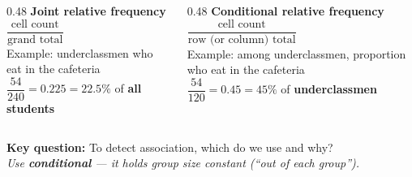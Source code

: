 \documentclass[aspectratio=169, 11pt]{beamer}
\begin{document}
{
\begin{frame}[t, plain]
  \vspace{1.05cm}\par
  \hspace{0.4cm}%
  \begin{minipage}{0.93\textwidth}
    \vspace{1em}
    \small
    \begin{columns}[T]
      \begin{column}{0.48\textwidth}
        \textbf{\color{greenacc}Joint relative frequency}\\[4pt]
        $\dfrac{\text{cell count}}{\text{grand total}}$\\[8pt]
        Example: underclassmen who eat in the cafeteria\\[4pt]
        $\dfrac{54}{240} = 0.225 = 22.5\%$ of \textbf{all students}
      \end{column}
      \begin{column}{0.48\textwidth}
        \textbf{\color{greenacc}Conditional relative frequency}\\[4pt]
        $\dfrac{\text{cell count}}{\text{row (or column) total}}$\\[8pt]
        Example: among underclassmen, proportion who eat in the cafeteria\\[4pt]
        $\dfrac{54}{120} = 0.45 = 45\%$ of \textbf{underclassmen}
      \end{column}
    \end{columns}
    \vspace{0.6cm}
    \textbf{\color{navy}Key question:} To detect association, which do we use and why?\\
    \textit{Use \textbf{conditional} --- it holds group size constant (``out of each group'').}
  \end{minipage}
\end{frame}
}
\end{document}
